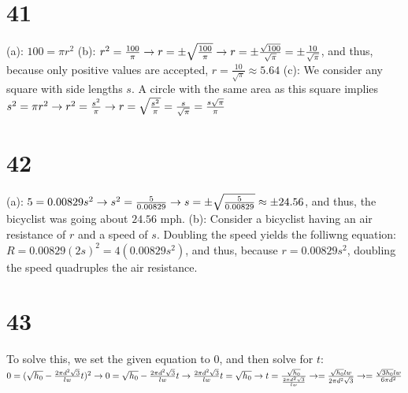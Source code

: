 \documentclass{article}
\theoremstyle{definition}
\begin{document}
\section*{41}
(a): $100 = \pi r^2$\newline
(b): $r^2=\frac{100}{\pi}\newline\rightarrow r=\pm\sqrt\frac{100}{\pi}\newline\rightarrow r=\pm\frac{\sqrt{100}}{\sqrt{\pi}}=\pm\frac{10}{\sqrt{\pi}}$, 
and thus, because only positive values are accepted, $r=\frac{10}{\sqrt{\pi}}\approx 5.64$
(c): We consider any square with side lengths $s$. A circle with the same area as this square implies $s^2=\pi r^2\newline\rightarrow 
r^2=\frac{s^2}{\pi}\newline\rightarrow r=\sqrt\frac{s^2}{\pi}=\frac{s}{\sqrt{\pi}}=\frac{s\sqrt{\pi}}{\pi}$

\section*{42}
(a): $5=0.00829s^2\newline\rightarrow s^2=\frac{5}{0.00829}\newline\rightarrow s=\pm\sqrt\frac{5}{0.00829}\approx \pm 24.56$, and thus, the bicyclist 
was going about $24.56$ mph.\newline
(b): Consider a bicyclist having an air resistance of $r$ and a speed of $s$. Doubling the speed yields the folliwng equation:\newline 
$R=0.00829(2s)^2=4(0.00829s^2)$, and thus, because $r=0.00829s^2$, doubling the speed quadruples the air resistance. 

\section*{43}
To solve this, we set the given equation to $0$, and then solve for $t$:\newline
$0=(\sqrt{h_0}-\frac{2\pi d^2\sqrt{3}}{lw}t)^2\newline\rightarrow 0=\sqrt{h_0}-\frac{2\pi d^2\sqrt{3}}{lw}t\newline\rightarrow
\frac{2\pi d^2\sqrt{3}}{lw}t=\sqrt{h_0}\newline\rightarrow t=\frac{\sqrt{h_0}}{\frac{2\pi d^2\sqrt{3}}{lw}}\newline\rightarrow =
\frac{\sqrt{h_0}lw}{2\pi d^2\sqrt{3}}\newline\rightarrow =\frac{\sqrt{3h_0}lw}{6\pi d^2}$
\end{document}
